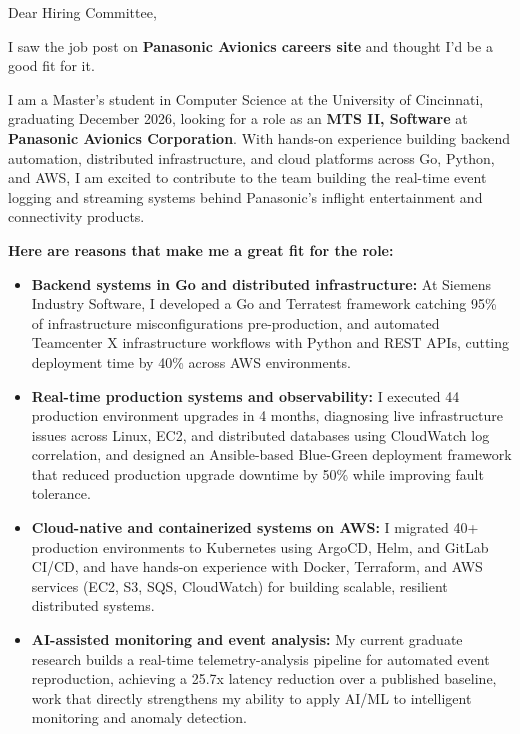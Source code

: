 \documentclass[11pt]{letter}
\date{}
\begin{document}
\begin{letter}{}

\opening{Dear Hiring Committee,}

I saw the job post on \textbf{Panasonic Avionics careers site} and thought I'd be a good fit for it.

I am a Master's student in Computer Science at the University of Cincinnati, graduating December 2026, looking for a role as an \textbf{MTS II, Software} at \textbf{Panasonic Avionics Corporation}. With hands-on experience building backend automation, distributed infrastructure, and cloud platforms across Go, Python, and AWS, I am excited to contribute to the team building the real-time event logging and streaming systems behind Panasonic's inflight entertainment and connectivity products.

\textbf{Here are reasons that make me a great fit for the role:}

\begin{itemize}[leftmargin=*, itemsep=0.45em]
    \item \textbf{Backend systems in Go and distributed infrastructure:} At Siemens Industry Software, I developed a Go and Terratest framework catching 95\% of infrastructure misconfigurations pre-production, and automated Teamcenter X infrastructure workflows with Python and REST APIs, cutting deployment time by 40\% across AWS environments.

    \item \textbf{Real-time production systems and observability:} I executed 44 production environment upgrades in 4 months, diagnosing live infrastructure issues across Linux, EC2, and distributed databases using CloudWatch log correlation, and designed an Ansible-based Blue-Green deployment framework that reduced production upgrade downtime by 50\% while improving fault tolerance.

    \item \textbf{Cloud-native and containerized systems on AWS:} I migrated 40+ production environments to Kubernetes using ArgoCD, Helm, and GitLab CI/CD, and have hands-on experience with Docker, Terraform, and AWS services (EC2, S3, SQS, CloudWatch) for building scalable, resilient distributed systems.

    \item \textbf{AI-assisted monitoring and event analysis:} My current graduate research builds a real-time telemetry-analysis pipeline for automated event reproduction, achieving a 25.7x latency reduction over a published baseline, work that directly strengthens my ability to apply AI/ML to intelligent monitoring and anomaly detection.


\end{itemize}
\end{letter}
\end{document}
